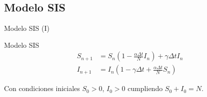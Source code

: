 
          



\subsection{Modelo SIS}


\begin{frame}{Modelo SIS (I)}
    \begin{block}{Modelo SIS \cite{allenDiscretetimeSISIR1994}}
        \begin{equation}
            \label{eqn: modelo_SIS}
            \begin{aligned}
            S_{n+1} & = S_n \left(1-\frac{\alpha\Delta t}{N} I_n \right) + \gamma \Delta t I_n \\
            I_{n+1} & = I_n \left( 1-\gamma \Delta t + \frac{\alpha\Delta t}{N} S_n \right)
            \end{aligned}
            \end{equation}
            
            Con condiciones iniciales $S_0>0$, $I_0>0$ cumpliendo $S_0+I_0=N$.
    \end{block}
\end{frame}


